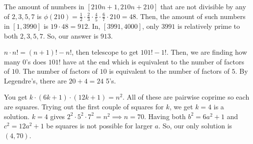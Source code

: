 \documentclass[11pt]{article}
\begin{document}

\begin{sol}
The amount of numbers in $[210n+1, 210n+210]$ that are not divisible by any of $2,3,5,7$ is $\phi(210)=\frac{1}{2}\cdot \frac{2}{3}\cdot \frac{4}{5}\cdot \frac{6}{7}\cdot 210= 48$. Then, the amount of such numbers in $[1,3990]$ is $19\cdot 48= 912$.  In, $[3991, 4000]$, only $3991$ is relatively prime to both $2,3,5,7$. So, our answer is $\boxed{913}$.
\end{sol}


\begin{sol}
$n\cdot n! = (n+1)!-n!$, then telescope to get $101!-1!$. Then, we are finding how many $0$'s does $101!$ have at the end which is equivalent to the number of factors of $10$. The number of factors of $10$ is equivalent to the number of factors of $5$. By Legendre's, there are $20+4=\boxed{24}$ 5's.
\end{sol}



\begin{sol}
You get $k\cdot (6k+1)\cdot (12k+1)=n^2$. All of these are pairwise coprime so each are squares. Trying out the first couple of squares for $k$, we get $k=4$ is a solution. $k=4$ gives $2^2\cdot 5^2\cdot 7^2=n^2\implies n = 70$. Having both $b^2=6a^2+1$ and $c^2=12a^2+1$ be squares is not possible for larger $a$. So, our only solution is $\boxed{(4,70)}$.
\end{sol}
 
\end{document}
